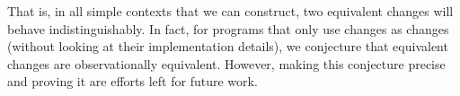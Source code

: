 




That is, in all simple contexts that we can construct, two equivalent
changes will behave indistinguishably. In fact, for programs that
only use changes as changes (without looking at their
implementation details), we conjecture that equivalent changes are
observationally equivalent. However, making this conjecture
precise and proving it are efforts left for future work.



